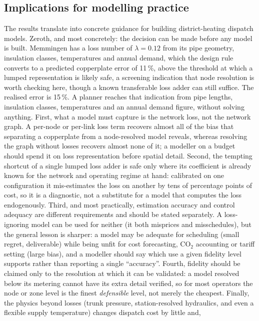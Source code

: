 \documentclass[a4paper,fleqn]{cas-sc}
\begin{document}
\subsection{Implications for modelling practice}
The results translate into concrete guidance for building district-heating dispatch models.
Zeroth, and most concretely: the decision can be made before any model is built. Memmingen has a loss number of $\lambda=0.12$ from its pipe geometry, insulation classes, temperatures and annual demand, which the design rule converts to a predicted copperplate error of 11\,\%, above the threshold at which a lumped representation is likely safe, a screening indication that node resolution is worth checking here, though a known transferable loss adder can still suffice. The realised error is 15\,\%. A planner reaches that indication from pipe lengths, insulation classes, temperatures and an annual demand figure, without solving anything. First, what a model must capture is the network loss, not the network graph. A per-node or
per-link loss term recovers almost all of the bias that separating a copperplate from a
node-resolved model reveals, whereas resolving the graph without losses recovers almost none
of it; a modeller on a budget should spend it on loss representation before spatial detail.
Second, the tempting shortcut of a single lumped loss adder is safe only where its coefficient
is already known for the network and operating regime at hand: calibrated on one configuration
it mis-estimates the loss on another by tens of percentage points of cost, so it is a
diagnostic, not a substitute for a model that computes the loss endogenously. Third, and most
practically, estimation accuracy and control adequacy are different requirements and should be
stated separately. A loss-ignoring model can be used for neither (it both misprices and
misschedules), but the general lesson is sharper: a model may be adequate for scheduling
(small regret, deliverable) while being unfit for cost forecasting, CO$_2$ accounting or tariff
setting (large bias), and a modeller should say which use a given fidelity level supports rather
than reporting a single ``accuracy''. Fourth, fidelity should be claimed only to the resolution
at which it can be validated: a model resolved below its metering cannot have its extra detail
verified, so for most operators the node or zone level is the finest \emph{defensible} level,
not merely the cheapest. Finally, the physics beyond losses (trunk pressure, station-resolved
hydraulics, and even a flexible supply temperature) changes dispatch cost by little and,
\end{document}

